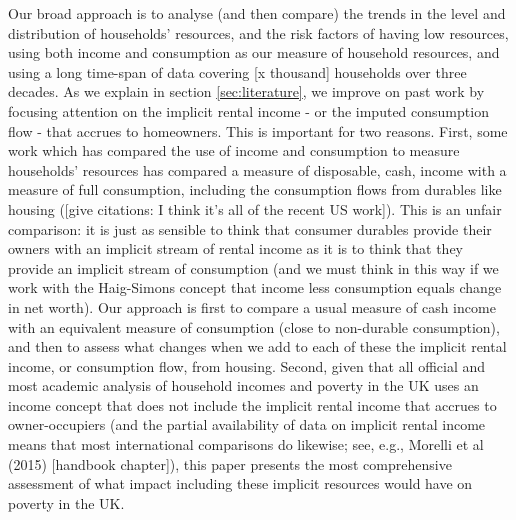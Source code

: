 Our broad approach is to analyse (and then compare) the trends in the level and distribution of households' resources, and the risk factors of having low resources, using both income and consumption as our measure of household resources, and using a long time-span of data covering [x thousand] households over three decades. As we explain in section \ref{sec:literature}, we improve on past work by focusing attention on the implicit rental income - or the imputed consumption flow - that accrues to homeowners. This is important for two reasons. First, some work which has compared the use of income and consumption to measure households' resources has compared a measure of disposable, cash, income with a measure of full consumption, including the consumption flows from durables like housing ([give citations: I think it's all of the recent US work]). This is an unfair comparison: it is just as sensible to think that consumer durables provide their owners with an implicit stream of rental income as it is to think that they provide an implicit stream of consumption (and we must think in this way if we work with the Haig-Simons concept that income less consumption equals change in net worth). Our approach is first to compare a usual measure of cash income with an equivalent measure of consumption (close to non-durable consumption), and then to assess what changes when we add to each of these the implicit rental income, or consumption flow, from housing. Second, given that all official and most academic analysis of household incomes and poverty in the UK uses an income concept that does not include the implicit rental income that accrues to owner-occupiers (and the partial availability of data on implicit rental income means that most international comparisons do likewise; see, e.g., Morelli et al (2015) [handbook chapter]), this paper presents the most comprehensive assessment of what impact including these implicit resources would have on poverty in the UK.    



